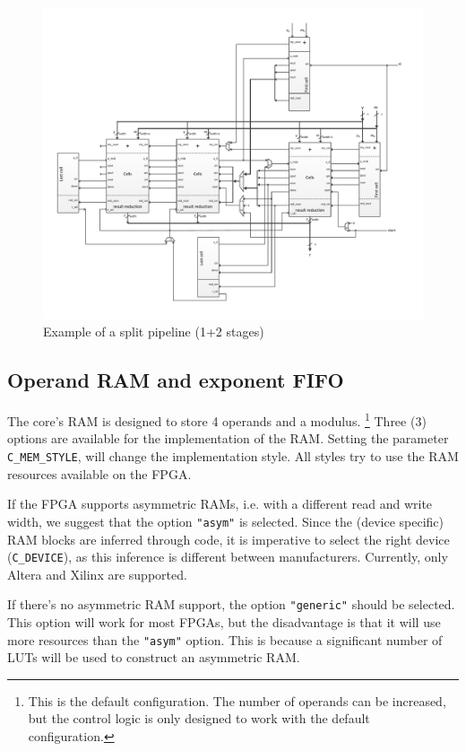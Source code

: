 \newpage 
\begin{figure}[H]
\centering
\includegraphics[trim=1.2cm 1.2cm 1.2cm 1.2cm, width=22cm, angle=90]{pictures/sys_pipeline.pdf}
\caption{Example of a split pipeline (1+2 stages)}
\label{pipeline_structure_split}
\end{figure}
\newpage


\subsection{Operand RAM and exponent FIFO} \label{subsec:RAM_and_FIFO}
The core's RAM is designed to store 4 operands and a modulus. \footnote{This is the default configuration. The number of operands can be increased, but the control logic is only designed to work with the default configuration.} Three (3) options are available for the implementation of the RAM. Setting the parameter \verb|C_MEM_STYLE|, will change the implementation style. All styles try to use the RAM resources available on the FPGA.

If the FPGA supports asymmetric RAMs, i.e. with a different read and write width, we suggest that the option \verb|"asym"| is selected. Since the (device specific) RAM blocks are inferred through code, it is imperative to select the right device (\verb|C_DEVICE|), as this inference is different between manufacturers. Currently, only Altera and Xilinx are supported.

If there's no asymmetric RAM support, the option \verb|"generic"| should be selected. This option will work for most FPGAs, but the disadvantage is that it will use more resources than the \verb|"asym"| option. This is because a significant number of LUTs will be used to construct an asymmetric RAM.

